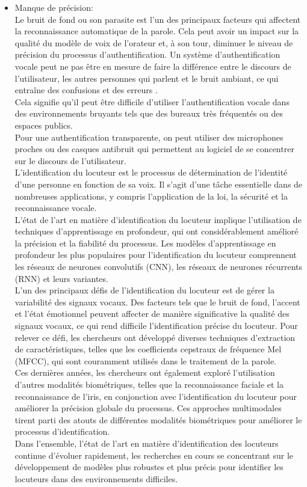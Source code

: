 \begin{itemize}
    \item Manque de précision:\\Le bruit de fond ou son parasite est l'un des principaux facteurs qui affectent la reconnaissance automatique de la parole. Cela peut avoir un impact sur la qualité du modèle de voix de l'orateur et, à son tour, diminuer le niveau de précision du processus d'authentification.
    Un système d'authentification vocale peut ne pas être en mesure de faire la différence entre le discours de l’utilisateur, les autres personnes qui parlent et le bruit ambiant, ce qui entraîne des confusions et des erreurs  \cite{aware}.
    \\Cela signifie qu'il peut être difficile d'utiliser l'authentification vocale dans des environnements bruyants tels que des bureaux très fréquentés ou des espaces publics.
    \\Pour une authentification transparente, on peut utiliser des microphones proches ou des casques antibruit qui permettent au logiciel de se concentrer sur le discours de l’utilisateur. 
    \\L'identification du locuteur est le processus de détermination de l'identité d'une personne en fonction de sa voix. Il s'agit d'une tâche essentielle dans de nombreuses applications, y compris l'application de la loi, la sécurité et la reconnaissance vocale.
    \\L'état de l'art en matière d'identification du locuteur implique l'utilisation de techniques d'apprentissage en profondeur, qui ont considérablement amélioré la précision et la fiabilité du processus. Les modèles d'apprentissage en profondeur les plus populaires pour l'identification du locuteur comprennent les réseaux de neurones convolutifs (CNN), les réseaux de neurones récurrents (RNN) et leurs variantes.
    \\L'un des principaux défis de l'identification du locuteur est de gérer la variabilité des signaux vocaux. Des facteurs tels que le bruit de fond, l'accent et l'état émotionnel peuvent affecter de manière significative la qualité des signaux vocaux, ce qui rend difficile l'identification précise du locuteur. Pour relever ce défi, les chercheurs ont développé diverses techniques d'extraction de caractéristiques, telles que les coefficients cepstraux de fréquence Mel (MFCC), qui sont couramment utilisés dans le traitement de la parole.
    \\Ces dernières années, les chercheurs ont également exploré l'utilisation d'autres modalités biométriques, telles que la reconnaissance faciale et la reconnaissance de l'iris, en conjonction avec l'identification du locuteur pour améliorer la précision globale du processus. Ces approches multimodales tirent parti des atouts de différentes modalités biométriques pour améliorer le processus d'identification.
    \\Dans l'ensemble, l'état de l'art en matière d'identification des locuteurs continue d'évoluer rapidement, les recherches en cours se concentrant sur le développement de modèles plus robustes et plus précis pour identifier les locuteurs dans des environnements difficiles.
\end{itemize}

